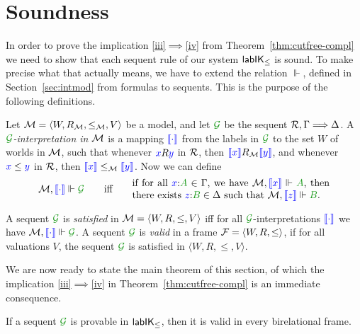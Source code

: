 
\section{Soundness}\label{sec:soundness}

In order to prove the implication \ref{iii}$\implies$\ref{iv} from
Theorem~\ref{thm:cutfree-compl} we need to show that each sequent rule
of our system $\mathsf{lab}\mathsf{IK}_{\le}$ is sound. To make precise what that actually
means, we have to extend the relation $\Vdash$, defined in
Section~\ref{sec:intmod} from formulas to sequents. This is the
purpose of the following definitions.

\begin{definition}\label{def:force-seq}
	Let $\mathcal{M} = \langle W, R_{\mathcal{M}}, \le_{\mathcal{M}}, V \rangle$ be a model, and let
	$\SG$ be the sequent $\mathcal{R} , \Gamma \Longrightarrow \Delta$. A \emph{$\SG$-interpretation
		in $\mathcal{M}$} is a mapping ${\color{blue}{\llbracket \cdot\rrbracket}}$ from the labels in $\SG$ to the set $W$ of worlds in $\mathcal{M}$, such that whenever ${\color{blue}{x}}R{\color{blue}{y}}$ in $\mathcal{R}$, then ${\color{blue}{\llbracket x\rrbracket}}R_{\mathcal{M}}{\color{blue}{\llbracket y\rrbracket}}$, and whenever ${\color{blue}{x}}\le{{\color{blue}{y}}}$ in $\mathcal{R}$, then ${\color{blue}{\llbracket x\rrbracket}}\le_{\mathcal{M}}{\color{blue}{\llbracket y\rrbracket}}$. Now we can define 
	\begin{equation}
	\M,\inter\cdot\Vdash\SG\qquad\mbox{iff}\qquad
	\parbox{20em}{if for all $\labels{x}{A} \in \Gamma$, we have $\M, \inter x \Vdash \fm A$, then there exists $\labels{z}{B} \in \Delta$ such that $\M, \inter z \Vdash \fm B$.}
	\end{equation}
\end{definition}

\begin{definition}\label{def:valid-seq}
	A sequent $\SG$ is \emph{satisfied} in $\mathcal{M} = \langle W, R, \le, V
	\rangle$ iff for all $\SG$-interpretations ${\color{blue}{\llbracket \cdot\rrbracket}}$ we have
	$\M,\inter\cdot\Vdash\SG$.
	A sequent $\SG$ is \emph{valid} in a frame $\mathcal{F} = \langle W, R,
	\le \rangle$, if for all valuations $V$, the sequent $\SG$ is
	satisfied in $\langle W, R, \le, V \rangle$.
\end{definition}

We are now ready to state the main theorem of this section, of which
the implication \ref{iii}$\implies$\ref{iv} in
Theorem~\ref{thm:cutfree-compl} is an immediate consequence.

\begin{theorem}\label{thm:soundness}
	If a sequent $\SG$ is provable in $\mathsf{lab}\mathsf{IK}_{\le}$, then it is valid in every birelational frame.
\end{theorem}

